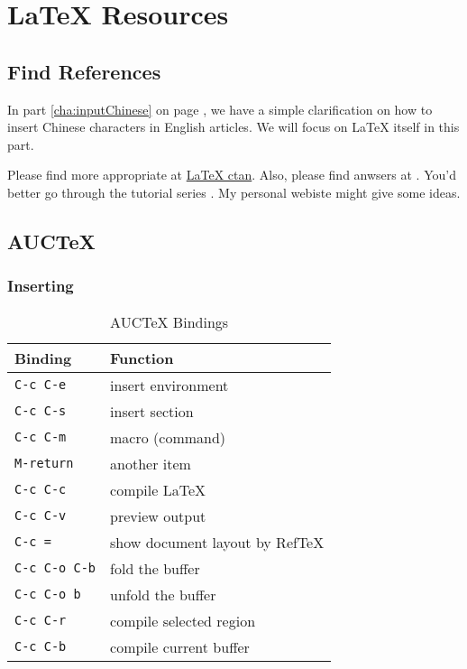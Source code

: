 \chapter{\LaTeX{} Resources}
\label{cha:latex-resources}

\section{Find References}
\label{sec:find-references}

In part \ref{cha:inputChinese} on page
\pageref{cha:inputChinese}, we have a simple clarification on
how to insert Chinese characters in English articles. We will
focus on \LaTeX{} itself in this part.

Please find more appropriate at
\href{https://ctan.org/topic/tut-latex?lang=en}{\LaTeX{}
  ctan}. Also, please find anwsers at
\cite{stackexchange}. You'd better go through the tutorial series
\cite{tutorial}. My personal webiste \cite{zhstar} might give some
ideas.

\section{AUCTeX}
\label{sec:auctex}

\subsection{Inserting}
\label{sec:inserting}

\begin{table}[tbp]
  \centering
  \begin{tabular}{|l|l|}
    \hline{}
    Binding & Function \\ \hline \hline{}
    \verb|C-c C-e| & insert environment \\ \hline{}
    \verb|C-c C-s| & insert section \\ \hline{}
    \verb|C-c C-m| & macro (command) \\ \hline{}
    \verb|M-return| & another item \\ \hline{}
    \verb|C-c C-c| & compile \LaTeX{} \\ \hline{}
    \verb|C-c C-v| & preview output \\ \hline{}
    \verb|C-c =| & show document layout by RefTeX \\ \hline{}
    \verb|C-c C-o C-b| & fold the buffer \\ \hline{}
    \verb|C-c C-o b| & unfold the buffer \\ \hline{}
    \verb|C-c C-r| & compile selected region \\ \hline{}
    \verb|C-c C-b| & compile current buffer \\ \hline
  \end{tabular}
  \caption{AUCTeX Bindings}
  \label{tab:auctex-bindings}
\end{table}

